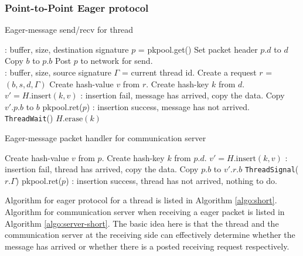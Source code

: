 \documentclass[11pt]{article}
\begin{document}
\subsubsection{Point-to-Point Eager protocol}

\begin{algorithm}
  \caption{Eager-message send/recv for thread}
  \label{algo:short}
  \begin{algorithmic}[1] %
     \Comment: buffer, size, destination signature 
      \State $p$ = pkpool.get()
      \State Set packet header $p.d$ to $d$
      \State Copy $b$ to $p.b$
      \State Post $p$ to network for send.
    \EndProcedure
    \\
     \Comment: buffer, size, source signature 
      \State $\Gamma$ = current thread id.
      \State Create a request $r$ = $(b,s,d,\Gamma)$
      \State Create hash-value $v$ from $r$.
      \State Create hash-key $k$ from $d$.
      \State $v' = H.\text{insert}(k,v)$
        \Comment: insertion fail, message has arrived, copy the data.
        \State Copy $v'.p.b$ to $b$
        \State pkpool.ret($p$)
      \Else
        \Comment: insertion success, message has not arrived.
        \State \texttt{ThreadWait}()
      \EndIf
      \State $H.\text{erase}(k)$
    \EndProcedure
  \end{algorithmic}
\end{algorithm}

\begin{algorithm}
  \caption{Eager-message packet handler for communication server}
  \label{algo:server-short}
  \begin{algorithmic}[1]
      \State Create hash-value $v$ from $p$.
      \State Create hash-key $k$ from $p.d$.
      \State $v' = H.\text{insert}(k,v)$
        \Comment: insertion fail, thread has arrived, copy the data.
        \State Copy $p.b$ to $v'.r.b$
        \State \texttt{ThreadSignal}($r.\Gamma$)
        \State pkpool.ret($p$)
      \Else
        \Comment: insertion success, thread has not arrived, nothing to do.
        \State \Return
      \EndIf
    \EndProcedure
  \end{algorithmic}
\end{algorithm}

Algorithm for eager protocol for a thread is listed in Algorithm
\ref{algo:short}. Algorithm for communication server when receiving a eager 
packet is listed in Algorithm \ref{algo:server-short}. The basic idea here is
that the thread and the communication server at the receiving side can effectively
determine whether the message has arrived or whether there is a posted receiving
request respectively.
\end{document}
